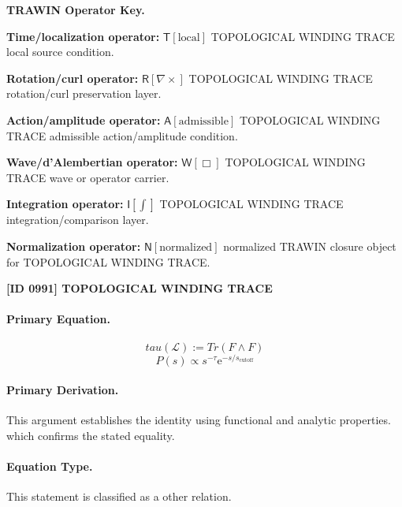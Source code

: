 \par\vspace{0.45\baselineskip}
\noindent\begin{minipage}[t]{\linewidth}
\begingroup
\small
\raggedright
\textbf{TRAWIN Operator Key.}\par
\noindent\textbf{Time/localization operator:} $\mathsf{T}\!\left[\mathrm{local}\right]$ TOPOLOGICAL WINDING TRACE local source condition.\par
\noindent\textbf{Rotation/curl operator:} $\mathsf{R}\!\left[\nabla\times\right]$ TOPOLOGICAL WINDING TRACE rotation/curl preservation layer.\par
\noindent\textbf{Action/amplitude operator:} $\mathsf{A}\!\left[\mathrm{admissible}\right]$ TOPOLOGICAL WINDING TRACE admissible action/amplitude condition.\par
\noindent\textbf{Wave/d'Alembertian operator:} $\mathsf{W}\!\left[\Box\right]$ TOPOLOGICAL WINDING TRACE wave or operator carrier.\par
\noindent\textbf{Integration operator:} $\mathsf{I}\!\left[\int\right]$ TOPOLOGICAL WINDING TRACE integration/comparison layer.\par
\noindent\textbf{Normalization operator:} $\mathsf{N}\!\left[\mathrm{normalized}\right]$ normalized TRAWIN closure object for TOPOLOGICAL WINDING TRACE.\par
\endgroup
\end{minipage}

\clearpage
\noindent\textbf{[ID 0991] TOPOLOGICAL WINDING TRACE}\par
\vspace{0.35em}
\paragraph{Primary Equation.}
\[
tau(\mathcal{L}):=Tr(F\wedge F)
\]
\[
P(s) \propto s^{-\tau} \mathrm{e}^{-s/s_{\text{cutoff}}}
\]

\paragraph{Primary Derivation.}
This argument establishes the identity using functional and analytic properties. which confirms the stated equality.
\paragraph{Equation Type.}
This statement is classified as a other relation.


